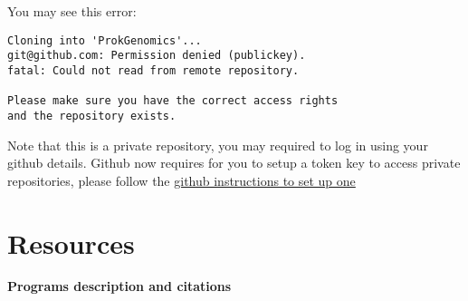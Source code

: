 \documentclass[
]{book}
\begin{document}
You may see this error:

\begin{verbatim}
Cloning into 'ProkGenomics'...
git@github.com: Permission denied (publickey).
fatal: Could not read from remote repository.

Please make sure you have the correct access rights
and the repository exists.
\end{verbatim}

Note that this is a private repository, you may required to log in using your github details. Github now requires for you to setup a token key to access private repositories, please follow the \href{https://docs.github.com/en/authentication/keeping-your-account-and-data-secure/managing-your-personal-access-tokens}{github instructions to set up one}

\hypertarget{resources}{%
\chapter{Resources}\label{resources}}

\textbf{Programs description and citations}
\end{document}
